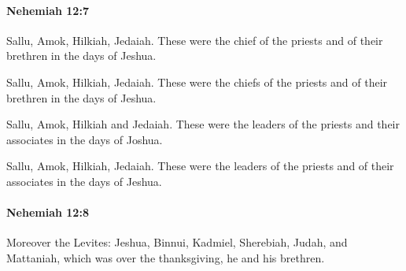 		\paragraph{Nehemiah 12:7} %
			\label{NEHEMIAH-12-7}

			Sallu, Amok, Hilkiah, Jedaiah. These were the chief of the priests and of their brethren in the days of Jeshua.

			\begin{versebox}
					\item[BHS] 
					\item[LXX] 
					\item[ASV] Sallu, Amok, Hilkiah, Jedaiah. These were the chiefs of the priests and of their brethren in the days of Jeshua.
					\item[NIV] Sallu, Amok, Hilkiah and Jedaiah. These were the leaders of the priests and their associates in the days of Joshua.
					\item[NRSV] Sallu, Amok, Hilkiah, Jedaiah. These were the leaders of the priests and of their associates in the days of Jeshua.
			\end{versebox}

		\paragraph{Nehemiah 12:8} %
			\label{NEHEMIAH-12-8}

			Moreover the Levites: Jeshua, Binnui, Kadmiel, Sherebiah, Judah, and Mattaniah, which was over the thanksgiving, he and his brethren.

